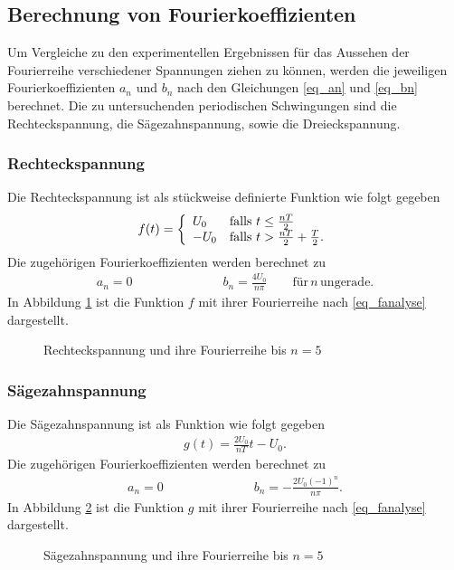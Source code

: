 \subsection{Berechnung von Fourierkoeffizienten}
\label{sec_berechnung}
Um Vergleiche zu den experimentellen Ergebnissen für das Aussehen der Fourierreihe verschiedener Spannungen ziehen zu können, werden
die jeweiligen Fourierkoeffizienten $a_n$ und $b_n$ nach den Gleichungen \eqref{eq_an} und \eqref{eq_bn} berechnet. Die zu untersuchenden
periodischen Schwingungen sind die Rechteckspannung, die Sägezahnspannung, sowie die Dreieckspannung. 
\subsubsection{Rechteckspannung}
Die Rechteckspannung ist als stückweise definierte Funktion wie folgt gegeben
\begin{align*}			
f(t) =
\left\{
	\begin{array}{l l}
	U_0  & \text{falls } t \leq \frac{nT}{2}\\
	-U_0 & \text{falls } t > \frac{nT}{2}+\frac{T}{2}.
	\end{array}
\right.
\end{align*}
Die zugehörigen Fourierkoeffizienten werden berechnet zu
\begin{align}
 a_n = 0 \hspace{3cm} b_n = \frac{4U_0}{n \pi} \qquad \text{für}\, n\, \text{ungerade}.
 \label{eq_rechteckkoeff}
\end{align}
In Abbildung \ref{pic_rechteckfourier} ist die Funktion $f$ mit ihrer Fourierreihe nach \eqref{eq_fanalyse} dargestellt.
\begin{figure}[H]
 
 \caption{Rechteckspannung und ihre Fourierreihe bis $n=5$}
 \label{pic_rechteckfourier}
\end{figure}

\subsubsection{Sägezahnspannung}
Die Sägezahnspannung ist als Funktion wie folgt gegeben
\begin{align*}			
 g(t) = \frac{2U_0}{nT}t - U_0.
\end{align*}
Die zugehörigen Fourierkoeffizienten werden berechnet zu
\begin{align}
 a_n = 0 \hspace{3cm} b_n = - \frac{2U_0 (-1)^n}{n \pi}.
 \label{eq_saegezahnkoeff}
\end{align}
In Abbildung \ref{pic_saegezahnfourier} ist die Funktion $g$ mit ihrer Fourierreihe nach \eqref{eq_fanalyse} dargestellt.
\begin{figure}[H]
 
 \caption{Sägezahnspannung und ihre Fourierreihe bis $n=5$}
 \label{pic_saegezahnfourier}
\end{figure}

